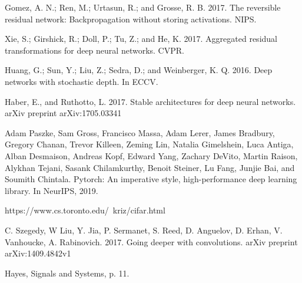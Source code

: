 \documentclass{article}
\theoremstyle{remark}
\begin{document}
\pagebreak
\begin{thebibliography}{9}

        Gomez, A. N.; Ren, M.; Urtasun, R.; and Grosse, R. B. 2017.
        The reversible residual network: Backpropagation without storing
        activations. NIPS.

        Xie, S.; Girshick, R.; Doll, P.; Tu, Z.; and He, K. 2017. 
        Aggregated residual transformations for deep neural networks. CVPR.

        Huang, G.; Sun, Y.; Liu, Z.; Sedra, D.; and Weinberger, K. Q. 2016.
        Deep networks with stochastic depth. In ECCV.

        Haber, E., and Ruthotto, L. 2017. Stable architectures for deep
        neural networks. arXiv preprint arXiv:1705.03341

    Adam Paszke, Sam Gross, Francisco Massa, Adam Lerer, James Bradbury, Gregory Chanan, Trevor Killeen, Zeming Lin, Natalia Gimelshein, Luca Antiga, Alban Desmaison, Andreas Kopf, 
    Edward Yang, Zachary DeVito, Martin Raison, Alykhan Tejani, Sasank Chilamkurthy, Benoit Steiner, Lu Fang, Junjie Bai, and Soumith Chintala. 
    Pytorch: An imperative style, high-performance deep learning library. In NeurIPS, 2019.

    https://www.cs.toronto.edu/~kriz/cifar.html
    
    C. Szegedy, W Liu, Y. Jia, P. Sermanet, S. Reed, D. Anguelov, D. Erhan, 
    V. Vanhoucke, A. Rabinovich. 2017.
    Going deeper with convolutions. arXiv preprint arXiv:1409.4842v1

    Hayes, Signals and Systems, p. 11.


\end{thebibliography}
\end{document}
